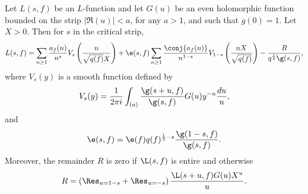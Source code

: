     \begin{theorem}
      Let $L(s,f)$ be an $L$-function and let $G(u)$ be an even holomorphic function bounded on the strip $|\Re(u)| < a$, for any $a > 1$, and such that $g(0) = 1$. Let $X > 0$. Then for $s$ in the critical strip,
      \[
        L(s,f) = \sum_{n \ge 1}\frac{a_{f}(n)}{n^{s}}V_{s}\left(\frac{n}{\sqrt{q(f)}X}\right)+\e(s,f)\sum_{n \ge 1}\frac{\conj{a_{f}(n)}}{n^{1-s}}V_{1-s}\left(\frac{nX}{\sqrt{q(f)}}\right)-\frac{R}{q^{\frac{s}{2}}\g(s,f)},
      \]
      where $V_{s}(y)$ is a smooth function defined by
      \[
        V_{s}(y) = \frac{1}{2\pi i}\int_{(a)}\frac{\g(s+u,f)}{\g(s,f)}G(u)y^{-u}\frac{du}{u},
      \]
      and
      \[
        \e(s,f) = \e(f)q(f)^{\frac{1}{2}-s}\frac{\g(1-s,f)}{\g(s,f)}.
      \]
      Moreover, the remainder $R$ is zero if $\L(s,f)$ is entire and otherwise
      \[
        R = \left(\Res_{u = 1-s}+\Res_{u = -s}\right)\frac{\L(s+u,f)G(u)X^{u}}{u}.
      \]
    \end{theorem}
